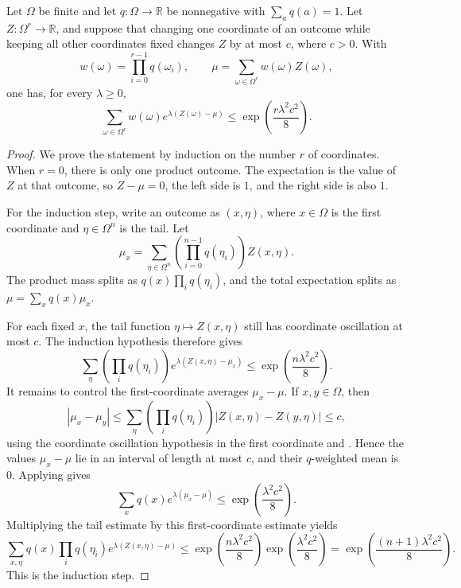 \begin{helper}
Let \(\Omega\) be finite and let \(q:\Omega\to\mathbb R\) be nonnegative with
\(\sum_a q(a)=1\).  Let \(Z:\Omega^r\to\mathbb R\), and suppose that changing
one coordinate of an outcome while keeping all other coordinates fixed changes
\(Z\) by at most \(c\), where \(c>0\).  With
\[
w(\omega)=\prod_{i=0}^{r-1}q(\omega_i),
\qquad
\mu=\sum_{\omega\in\Omega^r}w(\omega)Z(\omega),
\]
one has, for every \(\lambda\ge0\),
\[
\sum_{\omega\in\Omega^r} w(\omega)e^{\lambda(Z(\omega)-\mu)}
\le
\exp\!\left(\frac{r\lambda^2c^2}{8}\right).
\]
\end{helper}
\begin{proof}
We prove the statement by induction on the number \(r\) of coordinates.  When
\(r=0\), there is only one product outcome.  The expectation is the value of
\(Z\) at that outcome, so \(Z-\mu=0\), the left side is \(1\), and the right
side is also \(1\).

For the induction step, write an outcome as \((x,\eta)\), where \(x\in\Omega\)
is the first coordinate and \(\eta\in\Omega^n\) is the tail.  Let
\[
\mu_x=\sum_{\eta\in\Omega^n}
\left(\prod_{i=0}^{n-1}q(\eta_i)\right)Z(x,\eta).
\]
The product mass splits as \(q(x)\prod_i q(\eta_i)\), and the total
expectation splits as \(\mu=\sum_x q(x)\mu_x\).

For each fixed \(x\), the tail function \(\eta\mapsto Z(x,\eta)\) still has
coordinate oscillation at most \(c\).  The induction hypothesis therefore gives
\[
\sum_{\eta}
\left(\prod_i q(\eta_i)\right)
e^{\lambda(Z(x,\eta)-\mu_x)}
\le
\exp\!\left(\frac{n\lambda^2c^2}{8}\right).
\]
It remains to control the first-coordinate averages \(\mu_x-\mu\).  If
\(x,y\in\Omega\), then
\[
|\mu_x-\mu_y|
\le
\sum_\eta\left(\prod_i q(\eta_i)\right)|Z(x,\eta)-Z(y,\eta)|
\le c,
\]
using the coordinate oscillation hypothesis in the first coordinate and
.  Hence the values \(\mu_x-\mu\) lie in an
interval of length at most \(c\), and their \(q\)-weighted mean is \(0\).
Applying  gives
\[
\sum_x q(x)e^{\lambda(\mu_x-\mu)}
\le
\exp\!\left(\frac{\lambda^2c^2}{8}\right).
\]
Multiplying the tail estimate by this first-coordinate estimate yields
\[
\sum_{x,\eta}q(x)\prod_i q(\eta_i)e^{\lambda(Z(x,\eta)-\mu)}
\le
\exp\!\left(\frac{n\lambda^2c^2}{8}\right)
\exp\!\left(\frac{\lambda^2c^2}{8}\right)
=
\exp\!\left(\frac{(n+1)\lambda^2c^2}{8}\right).
\]
This is the induction step.
\end{proof}
